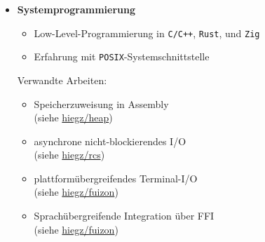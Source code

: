 \documentclass[]{article}
\begin{document}
\begin{minipage}[t]{0.49\linewidth}
    \begin{itemize}[leftmargin=0.15in, rightmargin=0.15in, label={}]
        \item {\large\bfseries Systemprogrammierung}

            \begin{itemize}
                \item Low-Level-Programmierung in \verb|C/C++|, \verb|Rust|, und \verb|Zig|
                \item Erfahrung mit \verb|POSIX|-Systemschnittstelle
            \end{itemize}
            Verwandte Arbeiten:
            \begin{itemize}
                \item Speicherzuweisung in Assembly \\
                    (siehe \href{https://github.com/hiegz/heap}{\ttfamily hiegz/heap})
                \item asynchrone nicht-blockierendes I/O \\
                    (siehe \href{https://github.com/hiegz/rcs}{\ttfamily hiegz/rcs})
                \item plattformübergreifendes Terminal-I/O \\
                    (siehe \href{https://github.com/hiegz/fuizon}{\ttfamily hiegz/fuizon})
                \item Sprachübergreifende Integration über FFI \\
                    (siehe \href{https://github.com/hiegz/fuizon}{\ttfamily hiegz/fuizon})
            \end{itemize}
    \end{itemize}
\end{minipage}
\hspace{10pt}
\end{document}
